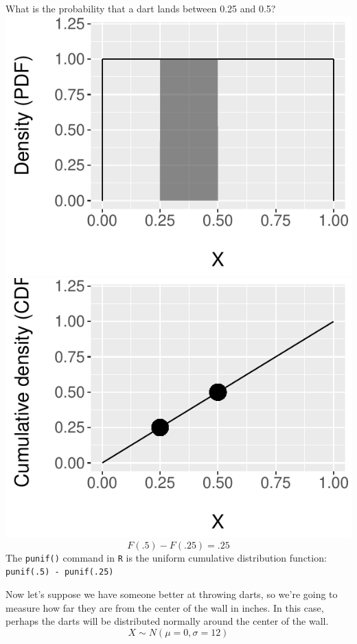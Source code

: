 \documentclass{beamer}
\begin{document}
\begin{frame}
What is the probability that a dart lands between 0.25 and 0.5?
\pause
\includegraphics[scale=.5]{figures/Unif5a.pdf}
\includegraphics[scale=.5]{figures/Unif5b.pdf} \\
\pause
$$F(.5) - F(.25) = .25$$
\pause
The \texttt{punif()} command in \texttt{R} is the uniform cumulative distribution function:
\texttt{punif(.5) - punif(.25)}
\end{frame}

\begin{frame}

Now let's suppose we have someone better at throwing darts, so we're going to measure how far they are from the center of the wall in inches. In this case, perhaps the darts will be distributed \alert{normally} around the center of the wall.
$$X\sim N(\mu = 0, \sigma = 12)$$
\end{frame}
\end{document}
